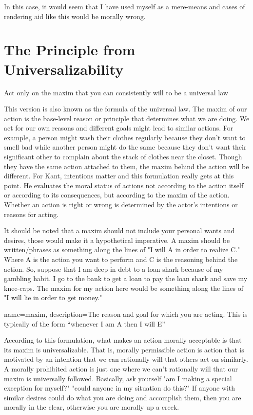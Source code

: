 In this case, it would seem that I have used myself as a mere-means and cases of rendering aid like this would be morally wrong.    
\section{The Principle from Universalizability}
\begin{center}
Act only on the maxim that you can consistently will to be a universal law
\end{center}
This version is also known as the formula of the universal law. The maxim of our action is the base-level reason or principle that determines what we are doing. We act for our own reasons and different goals might lead to similar actions. For example, a person might wash their clothes regularly because they don't want to smell bad while another person might do the same because they don't want their significant other to complain about the stack of clothes near the closet. Though they have the same action attached to them, the maxim behind the action will be different.  For Kant, intentions matter and this formulation really gets at this point. He evaluates the moral status of actions not according to the action itself or according to its consequences, but according to the maxim of the action. Whether an action is right or wrong  is determined by the actor’s intentions or reasons for acting.

It should be noted that a \gls{maxim} should not include your personal wants and desires, those would make it a hypothetical imperative. A maxim should be written/phrases as something along the lines of "I will A in order to realize C." Where A is the action you want to perform and C is the reasoning behind the action. So, suppose that I am deep in debt to a loan shark because of my gambling habit. I go to the bank to get a loan to pay the loan shark and save my knee-caps. The maxim for my action here would be something along the lines of "I will lie in order to get money."

{
  name=maxim,
  description={The reason and goal for which you are acting. This is typically of the form ``whenever I am A then I will E''}
}


According to this formulation, what makes an action morally acceptable is that its maxim is universalizable. That is, morally permissible action is action that is motivated by an intention that we can rationally will that others act on similarly. A morally prohibited action is just one where we can’t rationally will that our maxim is universally followed. Basically, ask yourself "am I making a special exception for myself?" "could anyone in my situation do this?" If anyone with similar desires could do what you are doing and accomplish them, then you are morally in the clear, otherwise you are morally up a creek.

